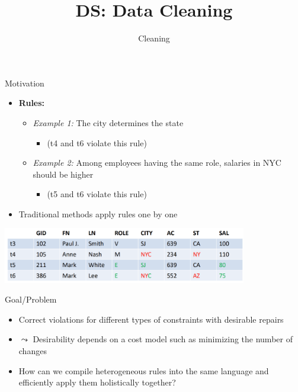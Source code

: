 \documentclass[aspectratio=169]{../latex_main/tntbeamer}  %
\title[Cleaning]{DS: Data Cleaning}
\subtitle{Cleaning}
\begin{document}
	
	\maketitle

 \begin{frame}[c]{Motivation}

\begin{itemize}
    \item \textbf{Rules:}
    \begin{itemize}
        \item \textit{Example 1:} The city determines the state
        \begin{itemize}
            \item (t4 and t6 violate this rule)
        \end{itemize}
        \item \textit{Example 2:} Among employees having the same role, salaries in NYC should be higher
        \begin{itemize}
            \item (t5 and t6 violate this rule)
        \end{itemize}
    \end{itemize}
    \item Traditional methods apply rules one by one
\end{itemize}

\centering\includegraphics[width=0.8\textwidth]{figure/bild18_table}

\end{frame}

\begin{frame}[c]{Goal/Problem}

\begin{itemize}
    \item Correct violations for different types of constraints with desirable repairs
    \item $\leadsto$ {Desirability} depends on a cost model such as minimizing the number of changes
    \item How can we compile heterogeneous rules into the same language and efficiently apply them holistically together?
\end{itemize}

\end{frame}
\end{document}
